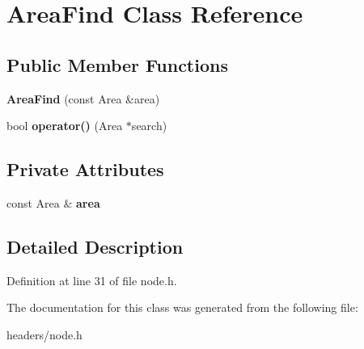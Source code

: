 \hypertarget{classAreaFind}{\section{Area\+Find Class Reference}
\label{classAreaFind}
}
\subsection*{Public Member Functions}
\begin{DoxyCompactItemize}
\item 
\hypertarget{classAreaFind_adccf1d4870a25906f13779f211ced9c0}{{\bfseries Area\+Find} (const Area \&area)}\label{classAreaFind_adccf1d4870a25906f13779f211ced9c0}

\item 
\hypertarget{classAreaFind_a711a5be8e4a6d23f4294e3e161a157ef}{bool {\bfseries operator()} (Area $\ast$search)}\label{classAreaFind_a711a5be8e4a6d23f4294e3e161a157ef}

\end{DoxyCompactItemize}
\subsection*{Private Attributes}
\begin{DoxyCompactItemize}
\item 
\hypertarget{classAreaFind_a92d9cfd586dfe884c26017d413063ca1}{const Area \& {\bfseries area}}\label{classAreaFind_a92d9cfd586dfe884c26017d413063ca1}

\end{DoxyCompactItemize}


\subsection{Detailed Description}


Definition at line 31 of file node.\+h.



The documentation for this class was generated from the following file\+:\begin{DoxyCompactItemize}
\item 
headers/node.\+h\end{DoxyCompactItemize}
